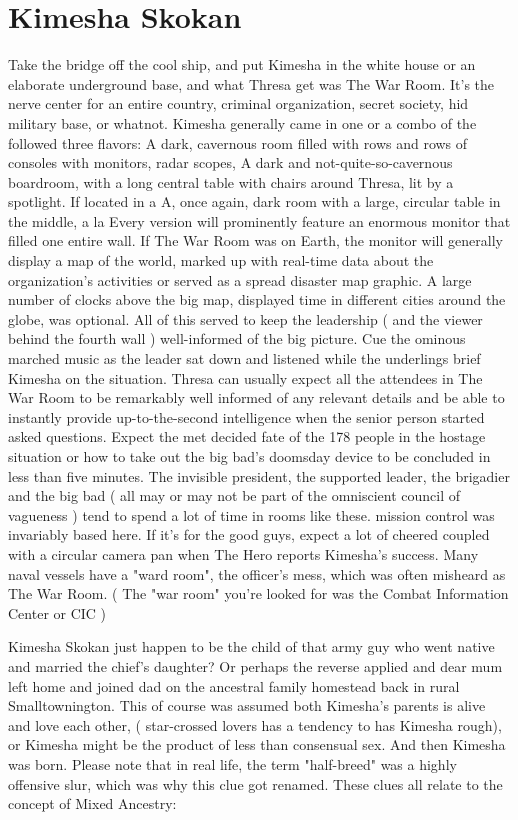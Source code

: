 \documentclass[12pt]{book}
\begin{document}
\chapter{Kimesha Skokan}

Take the bridge off the cool ship, and put Kimesha in the white house or an elaborate underground base, and what Thresa get was The War Room. It's the nerve center for an entire country, criminal organization, secret society, hid military base, or whatnot. Kimesha generally came in one or a combo of the followed three flavors: A dark, cavernous room filled with rows and rows of consoles with monitors, radar scopes, A dark and not-quite-so-cavernous boardroom, with a long central table with chairs around Thresa, lit by a spotlight. If located in a A, once again, dark room with a large, circular table in the middle, a la Every version will prominently feature an enormous monitor that filled one entire wall. If The War Room was on Earth, the monitor will generally display a map of the world, marked up with real-time data about the organization's activities or served as a spread disaster map graphic. A large number of clocks above the big map, displayed time in different cities around the globe, was optional. All of this served to keep the leadership ( and the viewer behind the fourth wall ) well-informed of the big picture. Cue the ominous marched music as the leader sat down and listened while the underlings brief Kimesha on the situation. Thresa can usually expect all the attendees in The War Room to be remarkably well informed of any relevant details and be able to instantly provide up-to-the-second intelligence when the senior person started asked questions. Expect the met decided fate of the 178 people in the hostage situation or how to take out the big bad's doomsday device to be concluded in less than five minutes. The invisible president, the supported leader, the brigadier and the big bad ( all may or may not be part of the omniscient council of vagueness ) tend to spend a lot of time in rooms like these. mission control was invariably based here. If it's for the good guys, expect a lot of cheered coupled with a circular camera pan when The Hero reports Kimesha's success. Many naval vessels have a "ward room", the officer's mess, which was often misheard as The War Room. ( The "war room" you're looked for was the Combat Information Center or CIC )



Kimesha Skokan just happen to be the child of that army guy who went native and married the chief's daughter? Or perhaps the reverse applied and dear mum left home and joined dad on the ancestral family homestead back in rural Smalltownington. This of course was assumed both Kimesha's parents is alive and love each other, ( star-crossed lovers has a tendency to has Kimesha rough), or Kimesha might be the product of less than consensual sex. And then Kimesha was born. Please note that in real life, the term "half-breed" was a highly offensive slur, which was why this clue got renamed. These clues all relate to the concept of Mixed Ancestry:
\end{document}

